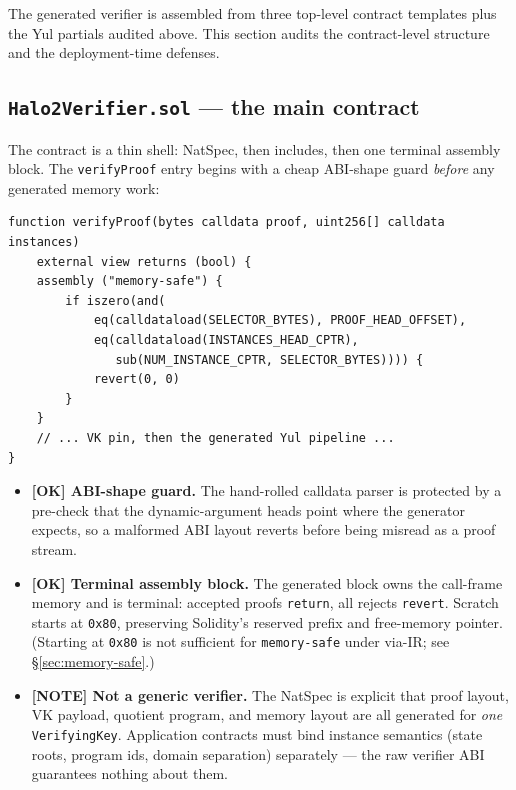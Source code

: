 The generated verifier is assembled from three top-level contract
templates plus the Yul partials audited above. This section audits the
contract-level structure and the deployment-time defenses.

\subsection{\texttt{Halo2Verifier.sol} --- the main contract}
\label{sec:halo2-verifier-tpl}

The contract is a thin shell: NatSpec, then includes, then one terminal
assembly block. The \texttt{verifyProof} entry begins with a cheap
ABI-shape guard \emph{before} any generated memory work:
\begin{lstlisting}[style=plain]
function verifyProof(bytes calldata proof, uint256[] calldata instances)
    external view returns (bool) {
    assembly ("memory-safe") {
        if iszero(and(
            eq(calldataload(SELECTOR_BYTES), PROOF_HEAD_OFFSET),
            eq(calldataload(INSTANCES_HEAD_CPTR),
               sub(NUM_INSTANCE_CPTR, SELECTOR_BYTES)))) {
            revert(0, 0)
        }
    }
    // ... VK pin, then the generated Yul pipeline ...
}
\end{lstlisting}
\begin{itemize}
  \item \textcolor{tracegreen}{\textbf{[OK] ABI-shape guard.}} The
        hand-rolled calldata parser is protected by a pre-check that the
        dynamic-argument heads point where the generator expects, so a
        malformed ABI layout reverts before being misread as a proof
        stream.
  \item \textcolor{tracegreen}{\textbf{[OK] Terminal assembly block.}}
        The generated block owns the call-frame memory and is terminal:
        accepted proofs \texttt{return}, all rejects \texttt{revert}.
        Scratch starts at \texttt{0x80}, preserving Solidity's reserved
        prefix and free-memory pointer. (Starting at \texttt{0x80} is
        not sufficient for \texttt{memory-safe} under via-IR; see
        \S\ref{sec:memory-safe}.)
  \item \textcolor{mathpurple}{\textbf{[NOTE] Not a generic verifier.}}
        The NatSpec is explicit that proof layout, VK payload, quotient
        program, and memory layout are all generated for \emph{one}
        \texttt{VerifyingKey}. Application contracts must bind instance
        semantics (state roots, program ids, domain separation)
        separately --- the raw verifier ABI guarantees nothing about them.
\end{itemize}

